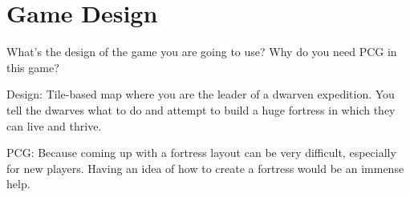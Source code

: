 \section{Game Design}
\label{03}

What’s the design of the game you are going to use? Why do you need PCG in this game?

Design: Tile-based map where you are the leader of a dwarven expedition. You tell the dwarves what to do and attempt to build a huge fortress in which they can live and thrive.

PCG: Because coming up with a fortress layout can be very difficult, especially for new players. Having an idea of how to create a fortress would be an immense help.